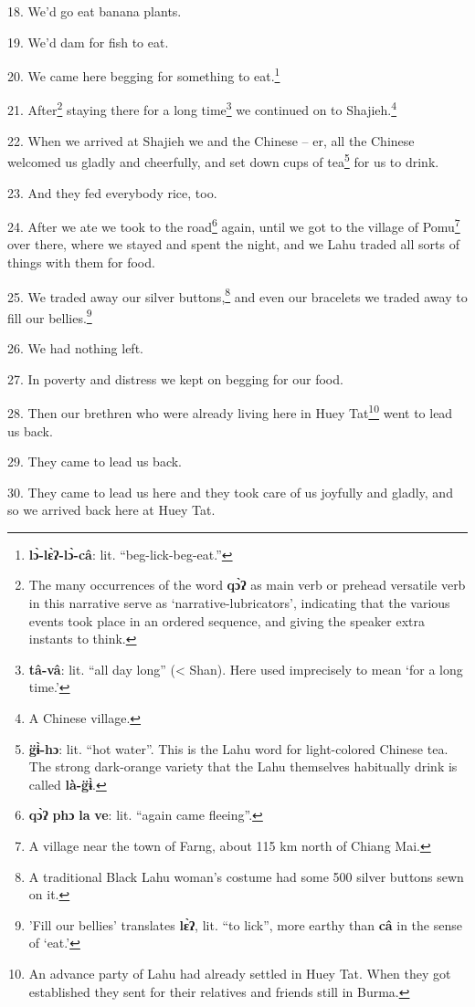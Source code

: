 18. We'd go eat banana plants.

19. We'd dam for fish to eat.

20. We came here begging for something to eat.\footnote{\textbf{lɔ̀-lɛ̀ʔ-lɔ̀-câ}: lit. ``beg-lick-beg-eat.''}

21. After\footnote{The many occurrences of the word \textbf{qɔ̀ʔ} as main verb or prehead versatile verb in this narrative serve as `narrative-lubricators', indicating that the various events took place in an ordered sequence, and giving the speaker extra instants to think.} staying there for a long time\footnote{\textbf{tâ-vâ}: lit. ``all day long'' (< Shan). Here used imprecisely to mean `for a long time.'} we continued on to Shajieh.\footnote{A Chinese village.}

22. When we arrived at Shajieh we and the Chinese -- er, all the Chinese welcomed
us gladly and cheerfully, and set down cups of tea\footnote{\textbf{g̈ɨ̀-hɔ}: lit. ``hot water''. This is the Lahu word for light-colored Chinese tea. The strong dark-orange variety that the Lahu themselves habitually drink is called \textbf{là-g̈ɨ̀}.} for us to drink.

23. And they fed everybody rice, too.

24. After we ate we took to the road\footnote{\textbf{qɔ̀ʔ} \textbf{phɔ} \textbf{la} \textbf{ve}: lit. ``again came fleeing''.} again, until we got to the village of Pomu\footnote{A village near the town of Farng, about 115 km north of Chiang Mai.}
over there, where we stayed and spent the night, and we Lahu traded all sorts of
things with them for food.

25. We traded away our silver buttons,\footnote{A traditional Black Lahu woman's costume had some 500 silver buttons sewn on it.} and even our bracelets we traded away
to fill our bellies.\footnote{'Fill our bellies' translates \textbf{lɛ̀ʔ}, lit. ``to lick'', more earthy than \textbf{câ} in the sense of `eat.'}

26. We had nothing left.

27. In poverty and distress we kept on begging for our food.

28. Then our brethren who were already living here in Huey Tat\footnote{An advance party of Lahu had already settled in Huey Tat. When they got established they sent for their relatives and friends still in Burma.} went to lead
us back.

29. They came to lead us back.

30. They came to lead us here and they took care of us joyfully and gladly, and
so we arrived back here at Huey Tat.

